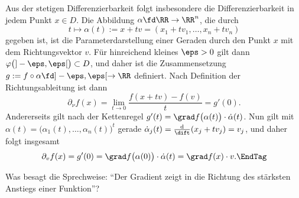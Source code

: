\begin{antwort}
  Aus der stetigen Differenzierbarkeit folgt insbesondere die 
  Differenzierbarkeit in jedem Punkt $x\in D$. Die 
  Abbildung $\alpha \fd \RR \to \RR^n$, die durch 
  \[
  t \mapsto \alpha(t) := x+tv = 
  (x_1+tv_1, \ldots, x_n +tv_n )
  \]
  gegeben ist, ist die Parameterdarstellung einer Geraden 
  durch den Punkt $x$ mit dem Richtungsvektor $v$. Für hinreichend 
  kleines $\eps>0$ gilt dann  
  $\varphi \big( ] - \eps, \eps [ \big) \subset D$, und daher ist die 
  Zusammensetzung $g := f \circ \alpha \fd ]-\eps, \eps[ \to \RR$ definiert. 
  Nach Definition der Richtungsableitung ist dann 
  \[
  \partial_\nu f(x) = \lim_{t\to 0} \frac{f(x+tv)-f(v)}{t} = g'(0).
  \]
  Andererseits gilt nach der Kettenregel 
  $g'(t)=\grad f\big( \alpha(t) \big) \cdot \dot{\alpha}(t)$. 
  Nun gilt mit 
  $\alpha(t) = \big( \alpha_1 (t), \ldots, \alpha_n (t) \big)^t$ 
  gerade  
  $\dot{\alpha}_j (t) = \frac{\mathrm{d}}{\dift} (x_j+tv_j )=v_j$, und 
  daher folgt insgesamt
  \begin{equation}
    \partial_v f(x) = g'(0)=\grad f\big( \alpha(0) \big) 
    \cdot \dot{\alpha}(t)= \grad f(x) \cdot v. \EndTag
  \end{equation}
\end{antwort}

\begin{frage}\label{10_gradanstieg}
  Was besagt die Sprechweise: "`Der Gradient zeigt in die Richtung 
  des stärksten Anstiegs einer Funktion"'?
\end{frage}

